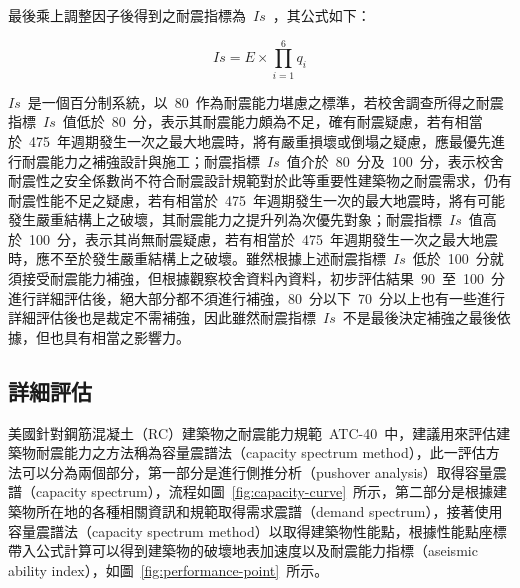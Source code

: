 最後乘上調整因子後得到之耐震指標為~$Is$~，其公式如下：

  \begin{equation}Is = E \times \prod_{i=1}^6 q_i \end{equation} 


$Is$~是一個百分制系統，以~80~作為耐震能力堪慮之標準，若校舍調查所得之耐震指標~$Is$~值低於~80~分，表示其耐震能力頗為不足，確有耐震疑慮，若有相當於~475~年週期發生一次之最大地震時，將有嚴重損壞或倒塌之疑慮，應最優先進行耐震能力之補強設計與施工；耐震指標~$Is$~值介於~80~分及~100~分，表示校舍耐震性之安全係數尚不符合耐震設計規範對於此等重要性建築物之耐震需求，仍有耐震性能不足之疑慮，若有相當於~475~年週期發生一次的最大地震時，將有可能發生嚴重結構上之破壞，其耐震能力之提升列為次優先對象；耐震指標~$Is$~值高於~100~分，表示其尚無耐震疑慮，若有相當於~475~年週期發生一次之最大地震時，應不至於發生嚴重結構上之破壞。雖然根據上述耐震指標~$Is$~低於~100~分就須接受耐震能力補強，但根據觀察校舍資料內資料，初步評估結果~90~至~100~分進行詳細評估後，絕大部分都不須進行補強，80~分以下~70~分以上也有一些進行詳細評估後也是裁定不需補強，因此雖然耐震指標~$Is$~不是最後決定補強之最後依據，但也具有相當之影響力。


\subsection{詳細評估}

美國針對鋼筋混凝土（RC）建築物之耐震能力規範~ATC-40\cite{applied1996seismic}~中，建議用來評估建築物耐震能力之方法稱為容量震譜法（capacity spectrum method），此一評估方法可以分為兩個部分，第一部分是進行側推分析（pushover analysis）取得容量震譜（capacity spectrum），流程如圖~\ref{fig:capacity-curve}~所示，第二部分是根據建築物所在地的各種相關資訊和規範取得需求震譜（demand spectrum），接著使用容量震譜法（capacity spectrum method）以取得建築物性能點，根據性能點座標帶入公式計算可以得到建築物的破壞地表加速度以及耐震能力指標（aseismic ability index），如圖~\ref{fig:performance-point}~所示。

